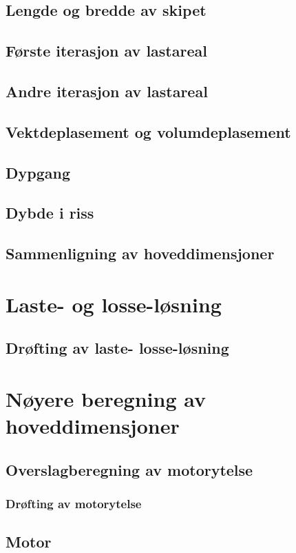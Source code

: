 \documentclass[norsk]{article}
\begin{document}
	\subsection{Lengde og bredde av skipet}
	\subsection{Første iterasjon av lastareal}
	\subsection{Andre iterasjon av lastareal}
	\subsection{Vektdeplasement og volumdeplasement}
	\subsection{Dypgang}
	\subsection{Dybde i riss}
	\subsection{Sammenligning av hoveddimensjoner}
	
\section{Laste- og losse-løsning}
	\subsection{Drøfting av laste- losse-løsning}

\section{Nøyere beregning av hoveddimensjoner}
	\subsection{Overslagberegning av motorytelse}
		\subsubsection{Drøfting av motorytelse}
	\subsection{Motor}
\end{document}
